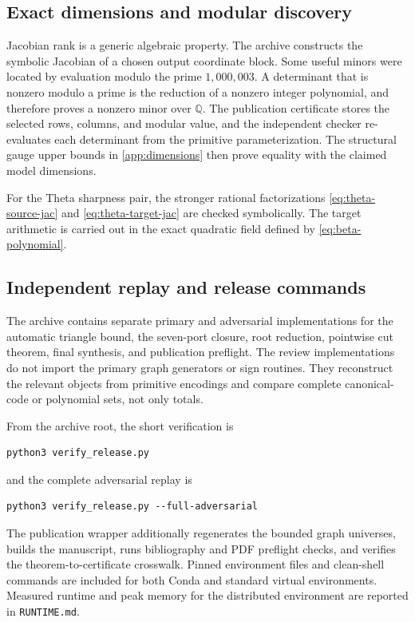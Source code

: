 \subsection{Exact dimensions and modular discovery}

Jacobian rank is a generic algebraic property.  The archive constructs the symbolic Jacobian of a chosen output coordinate block.  Some useful minors were located by evaluation modulo the prime $1{,}000{,}003$.  A determinant that is nonzero modulo a prime is the reduction of a nonzero integer polynomial, and therefore proves a nonzero minor over $\mathbb Q$.  The publication certificate stores the selected rows, columns, and modular value, and the independent checker re-evaluates each determinant from the primitive parameterization.  The structural gauge upper bounds in \cref{app:dimensions} then prove equality with the claimed model dimensions.

For the Theta sharpness pair, the stronger rational factorizations \eqref{eq:theta-source-jac} and \eqref{eq:theta-target-jac} are checked symbolically.  The target arithmetic is carried out in the exact quadratic field defined by \eqref{eq:beta-polynomial}.

\subsection{Independent replay and release commands}

The archive contains separate primary and adversarial implementations for the automatic triangle bound, the seven-port closure, root reduction, pointwise cut theorem, final synthesis, and publication preflight.  The review implementations do not import the primary graph generators or sign routines.  They reconstruct the relevant objects from primitive encodings and compare complete canonical-code or polynomial sets, not only totals.

From the archive root, the short verification is
\begin{verbatim}
python3 verify_release.py
\end{verbatim}
and the complete adversarial replay is
\begin{verbatim}
python3 verify_release.py --full-adversarial
\end{verbatim}
The publication wrapper additionally regenerates the bounded graph universes, builds the manuscript, runs bibliography and PDF preflight checks, and verifies the theorem-to-certificate crosswalk.  Pinned environment files and clean-shell commands are included for both Conda and standard virtual environments.  Measured runtime and peak memory for the distributed environment are reported in \texttt{RUNTIME.md}.

